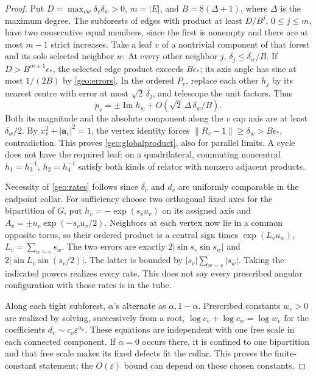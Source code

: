 \begin{proof}
Put \(D=\max_{vw}\delta_v\delta_w>0\), \(m=|E|\), and \(B=8(\Delta+1)\), where \(\Delta\) is the maximum degree. The subforests of edges with product at least \(D/B^j\), \(0\leq j\leq m\), have two consecutive equal members, since the first is nonempty and there are at most \(m-1\) strict increases. Take a leaf \(v\) of a nontrivial component of that forest and its sole selected neighbor \(w\). At every other neighbor \(j\), \(\delta_j\leq\delta_w/B\). If \(D>B^{m+1}\epsilon_*\), the selected edge product exceeds \(B\epsilon_*\); its axis angle has sine at most \(1/(2B)\) by \eqref{geo:errors}. In the ordered \(P_v\), replace each other \(h_j\) by its nearest centre with error at most \(\sqrt2\,\delta_j\), and telescope the unit factors. Thus
\[
             p_v=\pm\operatorname{Im}h_w+O(\sqrt2\,\Delta\,\delta_w/B).
\]
Both its magnitude and the absolute component along the \(v\) cap axis are at least \(\delta_w/2\). By \(x_v^2+|\mathbf a_v|^2=1\), the vertex identity forces \(\|R_v-1\|\geq\delta_w>B\epsilon_*\), contradiction. This proves \eqref{geo:globalproduct}, also for parallel limits. A cycle does not have the required leaf: on a quadrilateral, commuting noncentral \(h_1=h_3^{-1}\), \(h_2=h_4^{-1}\) satisfy both kinds of relator with nonzero adjacent products.

Necessity of \eqref{geo:rates} follows since \(\delta_v\) and \(d_v\) are uniformly comparable in the endpoint collar. For sufficiency choose two orthogonal fixed axes for the bipartition of \(G\), put \(h_v=-\exp(s_v u_v)\) on its assigned axis and \(A_v=\pm u_v\exp(-s_v u_v/2)\). Neighbors at each vertex now lie in a common opposite torus, so their ordered product is a central sign times \(\exp(L_v u_w)\), \(L_v=\sum_{w\sim v}s_w\). The two errors are exactly \(2|\sin s_v\sin s_w|\) and \(2|\sin L_v\sin(s_v/2)|\). The latter is bounded by \(|s_v|\sum_{w\sim v}|s_w|\). Taking the indicated powers realizes every rate. This does not say every prescribed angular configuration with those rates is in the tube.

Along each tight subforest, \(\alpha\)'s alternate as \(\alpha,1-\alpha\). Prescribed constants \(w_e>0\) are realized by solving, successively from a root, \(\log c_v+\log c_w=\log w_e\) for the coefficients \(d_v\sim c_v\varepsilon^{\alpha_v}\). These equations are independent with one free scale in each connected component. If \(\alpha=0\) occurs there, it is confined to one bipartition and that free scale makes its fixed defects fit the collar. This proves the finite-constant statement; the \(O(\varepsilon)\) bound can depend on those chosen constants.
\end{proof}

